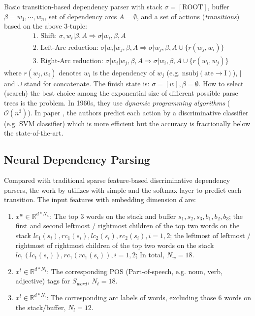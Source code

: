 Basic transition-based dependency parser  with stack $\sigma = [\text{ROOT}]$, buffer $\beta = w_1, \cdots, w_n$, set of dependency arcs $A = \emptyset$, and a set of actions (\emph{transitions}) based on the above $3$-tuple:
\begin{align}
&\text{1. Shift: } \sigma , w_i | \beta, A \Rightarrow \sigma | w_i, \beta, A \nonumber \\
&\text{2. Left-Arc reduction: } \sigma | w_i | w_j, \beta, A \Rightarrow \sigma | w_j, \beta, A \cup \{r(w_j, w_i)\} \nonumber \\
&\text{3. Right-Arc reduction: } \sigma | w_i | w_j, \beta, A \Rightarrow \sigma | w_i, \beta, A \cup \{r(w_i, w_j)\} \nonumber
\end{align}
where $r(w_j, w_i)$ denotes $w_i$ is the dependency of $w_j$ (e.g. $\text{nsubj}(\text{ate} \rightarrow \text{I})$), $|$ and $\cup$ stand for concatenate.
The finish state is: $\sigma = [w], \beta = \emptyset$.
How to select (search) the best choice among the exponential size of different possible parse trees is the problem.
In 1960s, they use \emph{dynamic programming algorithms} ($\mathcal{O}(n^3)$).
In paper , the authors predict each action by a discriminative classifier (e.g. SVM classifier) which is more efficient but the accuracy is fractionally below the state-of-the-art.

\subsection{Neural Dependency Parsing}
Compared with traditional sparse feature-based discriminative dependency parsers, the work by  utilizes  with simple  and the softmax layer to predict each transition.
The input features with embedding dimension $d$ are:

\begin{enumerate}
	\item $x^{w} \in \mathbb{R}^{d * N_w}$: The top $3$ words on the stack and buffer $s_1, s_2, s_3, b_1, b_2, b_3$; the first and second leftmost / rightmost children of the top two words on the stack $lc_1(s_i), rc_1(s_i), lc_2(s_i), rc_2(s_i), i = 1, 2$; the
	leftmost of leftmost / rightmost of rightmost children of the top two words on the stack $lc_1(lc_1(s_i)), rc_1(rc_1(s_i)), i = 1, 2$; In total, $N_w = 18$.
	\item $x^{t} \in \mathbb{R}^{d * N_t}$: The corresponding POS (Part-of-speech, e.g. noun, verb, adjective) tags for $S_{word}$, $N_t = 18$.
	\item $x^{l} \in \mathbb{R}^{d * N_l}$:  The corresponding arc labels of words, excluding those $6$ words on the stack/buffer, $N_l = 12$.
\end{enumerate}

